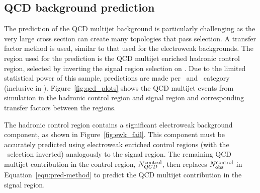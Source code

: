 \subsection{QCD background prediction}
\label{sec:qcd-pred}
The prediction of the QCD multijet background is particularly challenging
as the very large cross section can create many topologies that pass
selection. A transfer factor method is used, similar to that used for the electroweak backgrounds. The region used for the prediction is the QCD multijet enriched hadronic control region, 
selected by inverting the signal region selection on \mhtmet. Due to the limited statistical
power of this sample, predictions are made per \njet~and \scalht~category (inclusive in \nb).
Figure~\ref{fig:qcd_plots} shows the QCD multijet events from simulation 
in the hadronic control region and signal region and corresponding transfer factors
between the regions.

The hadronic control region contains a significant electroweak background component, 
as shown in Figure~\ref{fig:ewk_fail}. This component must be accurately predicted
using electroweak enriched control regions (with the \mhtmet~selection inverted) analogously 
to the signal region. The remaining QCD multijet contribution in the control region,
$N_{QCD}^{\rm control}$, then replaces $N_{\textrm{obs}}^{\rm control}$ in Equation~\ref{equ:pred-method} 
to predict the QCD multijet contribution in the signal region. 

